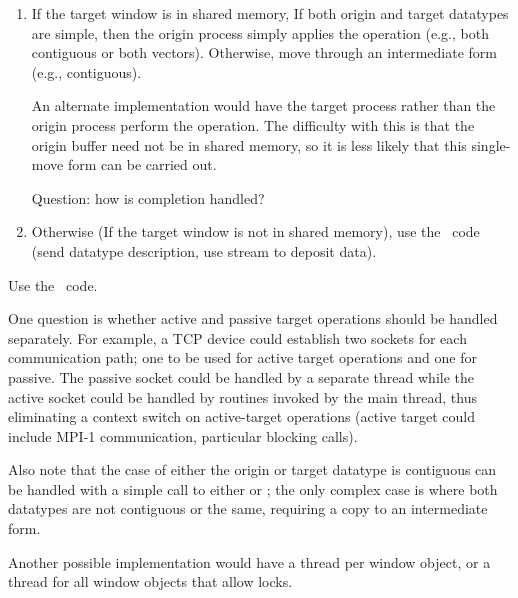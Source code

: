 \documentclass{article}
\begin{document}
\begin{shmem}
\begin{enumerate}
\item If the target window is in shared memory, 
If both origin and target datatypes are simple, then the origin process simply
applies the 
operation (e.g., both contiguous or both vectors).  Otherwise, move through an
intermediate form (e.g., contiguous).  

An alternate implementation would have the target process rather than the
origin process perform the operation.  The difficulty with this is that the
origin buffer need not be in shared memory, so it is less likely that this
single-move form can be carried out.

Question: how is completion handled?  

\item Otherwise (If the target window is not in shared memory),
use the \tcpname\ code (send datatype description, use stream to deposit
data).

\end{enumerate}
\end{shmem}
\begin{via}
Use the \tcpname\ code.  
\end{via}

One question is whether active and passive target operations should be handled
separately.  For example, a TCP device could establish two sockets for each
communication path; one to be used for active target operations and one for
passive.  The passive socket could be handled by a separate thread while the
active socket could be handled by routines invoked by the main thread, thus
eliminating a context switch on active-target operations (active target could
include MPI-1 communication, particular blocking calls).

Also note that the case of either the origin or target datatype is
contiguous can be handled with a simple call to either
 or ; the only complex case
is where both datatypes are not contiguous or the same, requiring a
copy to an intermediate form.

Another possible implementation would have a thread per window object, or a
thread for all window objects that allow locks. 
\end{document}
